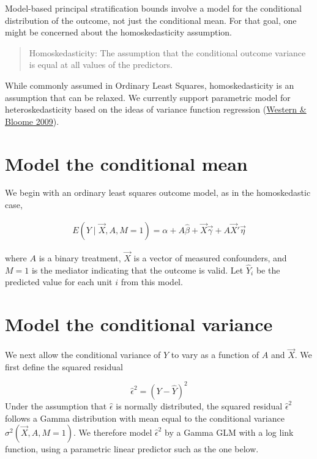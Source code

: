 \documentclass[
]{book}
\begin{document}
Model-based principal stratification bounds involve a model for the conditional distribution of the outcome, not just the conditional mean. For that goal, one might be concerned about the homoskedasticity assumption.

\begin{quote}
Homoskedasticity: The assumption that the conditional outcome variance is equal at all values of the predictors.
\end{quote}

While commonly assumed in Ordinary Least Squares, homoskedasticity is an assumption that can be relaxed. We currently support parametric model for heteroskedasticity based on the ideas of variance function regression (\href{https://doi.org/10.1111/j.1467-9531.2009.01222.x}{Western \& Bloome 2009}).

\section{Model the conditional mean}\label{model-the-conditional-mean}

We begin with an ordinary least squares outcome model, as in the homoskedastic case,

\[\begin{aligned}
E(Y\mid \vec{X},A,M = 1) =\alpha + A\hat\beta  + \vec{X}\vec\gamma + A\vec{X}'\vec\eta
\end{aligned}\]

where \(A\) is a binary treatment, \(\vec{X}\) is a vector of measured confounders, and \(M = 1\) is the mediator indicating that the outcome is valid. Let \(\hat{Y}_i\) be the predicted value for each unit \(i\) from this model.

\section{Model the conditional variance}\label{model-the-conditional-variance}

We next allow the conditional variance of \(Y\) to vary as a function of \(A\) and \(\vec{X}\). We first define the squared residual

\[\hat\epsilon^2 = \left(Y - \hat{Y}\right)^2\]
Under the assumption that \(\hat\epsilon\) is normally distributed, the squared residual \(\hat\epsilon^2\) follows a Gamma distribution with mean equal to the conditional variance \(\sigma^2(\vec{X},A,M=1)\). We therefore model \(\hat\epsilon^2\) by a Gamma GLM with a log link function, using a parametric linear predictor such as the one below.
\end{document}
